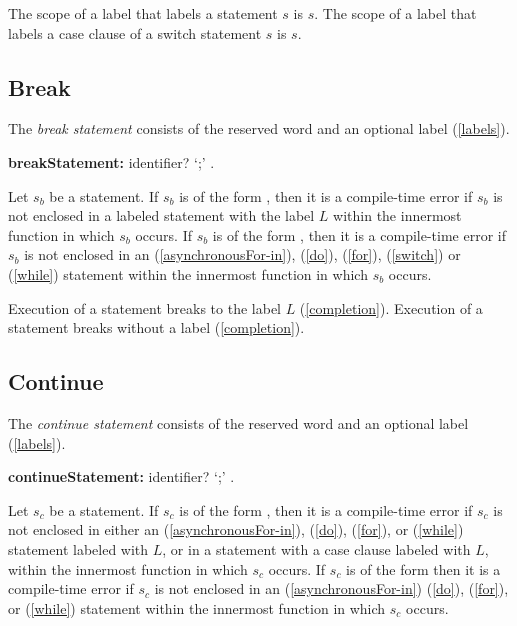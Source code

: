 \documentclass{article}
\begin{document}
\LMHash{}
The scope of a label that labels a statement $s$ is $s$.
The scope of a label that labels a case clause of a switch statement $s$ is $s$.



\subsection{Break}

\LMHash{}
The {\em break statement} consists of the reserved word \BREAK{} and an optional label (\ref{labels}).

\begin{grammar}
{\bf breakStatement:}\BREAK{} identifier? `{\escapegrammar ;}'
  .
\end{grammar}

\LMHash{}
Let $s_b$ be a \BREAK{} statement.
If $s_b$ is of the form ,
then it is a compile-time error if $s_b$ is not enclosed in a labeled statement
with the label $L$ within the innermost function in which $s_b$ occurs.
If $s_b$ is of the form \code{\BREAK{};},
then it is a compile-time error if $s_b$ is not enclosed in an
\code{\AWAIT{} \FOR{}} (\ref{asynchronousFor-in}),
\DO{} (\ref{do}), \FOR{} (\ref{for}), \SWITCH{} (\ref{switch})
or \WHILE{} (\ref{while}) statement within the innermost function in which $s_b$ occurs.

\LMHash{}
Execution of a \BREAK{} statement  breaks to the label $L$ (\ref{completion}).
Execution of a \BREAK{} statement \code{\BREAK{};} breaks without a label (\ref{completion}).


\subsection{Continue}

\LMHash{}
The {\em continue statement} consists of the reserved word \CONTINUE{} and an optional label (\ref{labels}).

\begin{grammar}
{\bf continueStatement:}\CONTINUE{} identifier? `{\escapegrammar ;}'
  .
\end{grammar}

\LMHash{}
Let $s_c$ be a \CONTINUE{} statement.
If $s_c$ is of the form ,
then it is a compile-time error if $s_c$ is not enclosed in either an
\code{\AWAIT{} \FOR{}} (\ref{asynchronousFor-in}),
\DO{} (\ref{do}), \FOR{} (\ref{for}), or \WHILE{} (\ref{while})
statement labeled with $L$, or in a \SWITCH{} statement with a case clause
labeled with $L$, within the innermost function in which $s_c$ occurs.
If $s_c$ is of the form \code{\CONTINUE{};}
then it is a compile-time error if $s_c$ is not enclosed in an
\code{\AWAIT{} \FOR{}} (\ref{asynchronousFor-in})
\DO{} (\ref{do}), \FOR{} (\ref{for}), or \WHILE{} (\ref{while}) statement
within the innermost function in which $s_c$ occurs.
\end{document}
